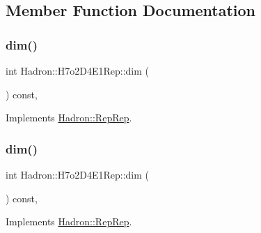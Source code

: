\subsection{Member Function Documentation}
\mbox{\label{structHadron_1_1H7o2D4E1Rep_a2c85ff036a1f57d041cf390a824a9f37}} 
\subsubsection{\texorpdfstring{dim()}{dim()}\hspace{0.1cm}{\footnotesize\ttfamily [1/5]}}
{\footnotesize\ttfamily int Hadron\+::\+H7o2\+D4\+E1\+Rep\+::dim (\begin{DoxyParamCaption}{ }\end{DoxyParamCaption}) const\hspace{0.3cm}{\ttfamily [inline]}, {\ttfamily [virtual]}}



Implements \mbox{\hyperlink{structHadron_1_1RepRep_a92c8802e5ed7afd7da43ccfd5b7cd92b}{Hadron\+::\+Rep\+Rep}}.

\mbox{\label{structHadron_1_1H7o2D4E1Rep_a2c85ff036a1f57d041cf390a824a9f37}} 
\subsubsection{\texorpdfstring{dim()}{dim()}\hspace{0.1cm}{\footnotesize\ttfamily [2/5]}}
{\footnotesize\ttfamily int Hadron\+::\+H7o2\+D4\+E1\+Rep\+::dim (\begin{DoxyParamCaption}{ }\end{DoxyParamCaption}) const\hspace{0.3cm}{\ttfamily [inline]}, {\ttfamily [virtual]}}



Implements \mbox{\hyperlink{structHadron_1_1RepRep_a92c8802e5ed7afd7da43ccfd5b7cd92b}{Hadron\+::\+Rep\+Rep}}.

\mbox{\label{structHadron_1_1H7o2D4E1Rep_a2c85ff036a1f57d041cf390a824a9f37}} 
